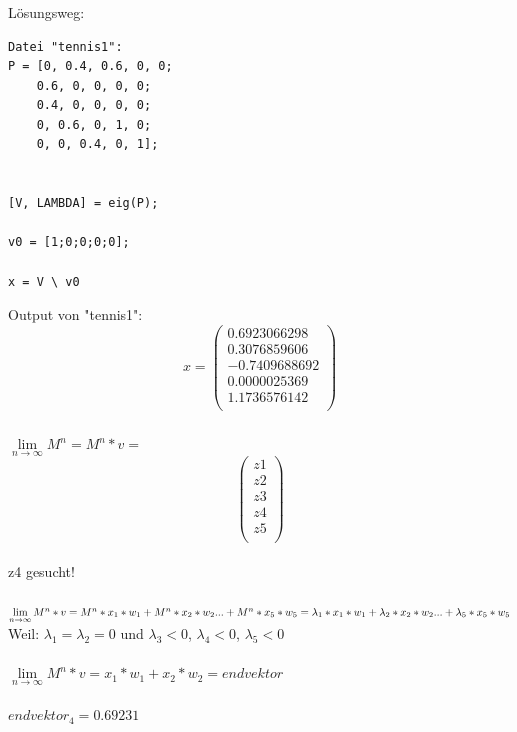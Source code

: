 \documentclass{article}
\begin{document}
\subsubsection{}

Lösungsweg: \\
\vspace{5mm}

\begin{lstlisting}
Datei "tennis1": 
P = [0, 0.4, 0.6, 0, 0;
    0.6, 0, 0, 0, 0;
    0.4, 0, 0, 0, 0;
    0, 0.6, 0, 1, 0;
    0, 0, 0.4, 0, 1];


[V, LAMBDA] = eig(P);

v0 = [1;0;0;0;0];

x = V \ v0
\end{lstlisting}
\vspace{5mm}
\normalsize
Output von "tennis1":
\[
x=
  \begin{pmatrix}
    0.6923066298 \\
    0.3076859606 \\
    -0.7409688692 \\
    0.0000025369 \\
    1.1736576142 \\
    
  \end{pmatrix}
\]

\subsubsection{}

$\lim\limits_{n \rightarrow \infty}{M^n} = M^n * v =$ \[
  \begin{pmatrix}
    z1 \\
    z2 \\
    z3 \\
    z4 \\
    z5 \\
  \end{pmatrix}
\]
\\
z4 gesucht! \\ \\
\vspace{5mm}
$\lim\limits_{n \rightarrow \infty}{M^n * v} = M^n * x_1 * w_1 + M^n * x_2 * w_2 ... + M^n * x_5 * w_5 \\
= \lambda_1 * x_1 * w_1 + \lambda_2 * x_2 * w_2 ... + \lambda_5* x_5 * w_5 \\$
\vspace{5mm} \\
Weil: $\lambda_1 = \lambda_2 = 0$ und  $\lambda_3 < 0$, $\lambda_4 < 0$, $\lambda_5 < 0$\\
\vspace{5mm} \\
$\lim\limits_{n \rightarrow \infty}{M^n * v} = x_1 * w_1  + x_2 * w_2 = endvektor$ \\
 \\
$endvektor_4 = 0.69231$
\end{document}
